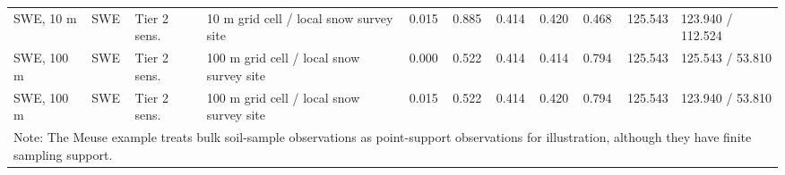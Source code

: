 \begin{table}[t]
\begin{tabular}{llllrrrrrrl}
SWE, 10 m & SWE & Tier 2 sens. & 10 m grid cell / local snow survey site & 0.015 & 0.885 & 0.414 & 0.420 & 0.468 & 125.543 & 123.940 / 112.524 \\
SWE, 100 m & SWE & Tier 2 sens. & 100 m grid cell / local snow survey site & 0.000 & 0.522 & 0.414 & 0.414 & 0.794 & 125.543 & 125.543 / 53.810 \\
SWE, 100 m & SWE & Tier 2 sens. & 100 m grid cell / local snow survey site & 0.015 & 0.522 & 0.414 & 0.420 & 0.794 & 125.543 & 123.940 / 53.810 \\
\hline
\multicolumn{11}{p{0.95\textwidth}}{\footnotesize Note: The Meuse example treats bulk soil-sample observations as point-support observations for illustration, although they have finite sampling support.} \\
\end{tabular}
\end{table}
